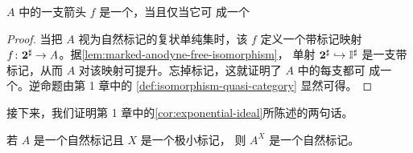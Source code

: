 \begin{corollary}\label{cor:isomorphism-extends-hc-isomorphism}
\trQuasiCategory{} $A$ 中的一支箭头 $f$ 是一个\trIsomorphism，当且仅当它可%
\trExtension{}成一个\trHomotopyCoherentIsomorphism
\begin{center}
\end{center}
\end{corollary}

\begin{proof}
当把\trQuasiCategory{} $A$ 视为自然标记的复状单纯集时，该\trIsomorphism{} $f$
定义一个带标记映射 $f\colon\mathbf{2}^{\sharp}\to A$。据\cref{lem:marked-anodyne-free-isomorphism}，
单射 $\mathbf{2}^{\sharp}\hookrightarrow\mathbb{I}^{\sharp}$ 是一支带标记\trAnodyneExtension，从而
$A$ 对该映射可提升。忘掉标记，这就证明了 $A$ 中的每支\trIsomorphism{}都可%
\trExtension{}成一个\trHomotopyCoherentIsomorphism。逆命题由第 1 章中的
\cref{def:isomorphism-quasi-category} 显然可得。
\end{proof}

接下来，我们证明第 1 章中的\cref{cor:exponential-ideal}所陈述的两句话。

\begin{lemma}\label{lem:exponential-naturally-marked}
若 $A$ 是一个自然标记\trQuasiCategory{}且 $X$ 是一个极小标记\trSimplicialSet，
则 $A^{X}$ 是一个自然标记\trQuasiCategory。
\end{lemma}

